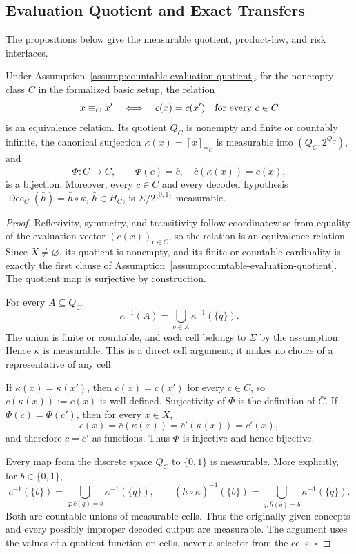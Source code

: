 \subsection{Evaluation Quotient and Exact Transfers}\label{app:step_002}


The propositions below give the measurable quotient, product-law, and risk
interfaces.

\begin{proposition}\label{prop:step-002-factorization}
Under Assumption~\ref{assump:countable-evaluation-quotient}, for the nonempty
class \(C\) in the formalized basic setup, the relation
\[
x\equiv_Cx'\quad\Longleftrightarrow\quad
c(x)=c(x')\quad\hbox{for every }c\in C
\]
is an equivalence relation. Its quotient \(Q_C\) is nonempty and finite or
countably infinite, the canonical surjection
\(\kappa(x)=[x]_{\equiv_C}\) is measurable into \((Q_C,2^{Q_C})\), and
\[
\Phi:C\longrightarrow\bar C,\qquad \Phi(c)=\bar c,
\quad \bar c(\kappa(x))=c(x),
\]
is a bijection. Moreover, every \(c\in C\) and every decoded hypothesis
\(\operatorname{Dec}_C(\bar h)=\bar h\circ\kappa\),
\(\bar h\in H_C\), is \(\Sigma/2^{\{0,1\}}\)-measurable.


\end{proposition}

\begin{proof}
Reflexivity, symmetry, and transitivity follow coordinatewise from
equality of the evaluation vector \((c(x))_{c\in C}\), so the relation is an
equivalence relation. Since \(X\ne\varnothing\), its quotient is nonempty,
and its finite-or-countable cardinality is exactly the first clause of
Assumption~\ref{assump:countable-evaluation-quotient}. The quotient map is
surjective by construction.

For every \(A\subseteq Q_C\),
\[
\kappa^{-1}(A)=\bigcup_{q\in A}\kappa^{-1}(\{q\}).
\tag{1}
\]
The union is finite or countable, and each cell belongs to \(\Sigma\) by the
assumption. Hence \(\kappa\) is measurable. This is a direct cell argument;
it makes no choice of a representative of any cell.

If \(\kappa(x)=\kappa(x')\), then \(c(x)=c(x')\) for every \(c\in C\), so
\(\bar c(\kappa(x)):=c(x)\) is well-defined. Surjectivity of \(\Phi\) is the
definition of \(\bar C\). If \(\Phi(c)=\Phi(c')\), then for every \(x\in X\),
\[
c(x)=\bar c(\kappa(x))=\bar c'(\kappa(x))=c'(x),
\]
and therefore \(c=c'\) as functions. Thus \(\Phi\) is injective and hence
bijective.

Every map from the discrete space \(Q_C\) to \(\{0,1\}\) is measurable. More
explicitly, for \(b\in\{0,1\}\),
\[
c^{-1}(\{b\})
=\bigcup_{q:\bar c(q)=b}\kappa^{-1}(\{q\}),
\qquad
(\bar h\circ\kappa)^{-1}(\{b\})
=\bigcup_{q:\bar h(q)=b}\kappa^{-1}(\{q\}).
\tag{2}
\]
Both are countable unions of measurable cells. Thus the originally given
concepts and every possibly improper decoded output are measurable. The
argument uses the values of a quotient function on cells, never a selector
from the cells. \(\square\)


\end{proof}

